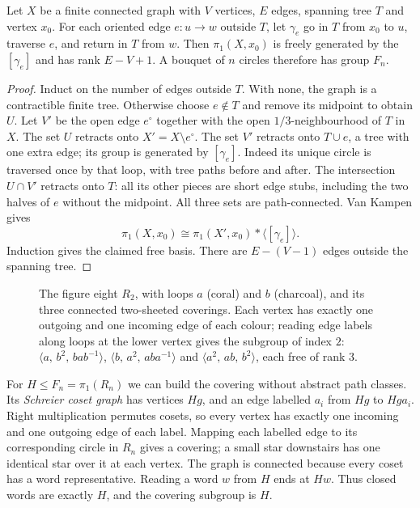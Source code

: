 \begin{theorem}\label{thm:wedge}
Let $X$ be a finite connected graph with $V$ vertices, $E$ edges, spanning tree $T$ and vertex $x_0$. For each oriented edge $e:u\to w$ outside $T$, let $\gamma_e$ go in $T$ from $x_0$ to $u$, traverse $e$, and return in $T$ from $w$. Then $\pi_1(X,x_0)$ is freely generated by the $[\gamma_e]$ and has rank $E-V+1$. A bouquet of $n$ circles therefore has group $F_n$.
\end{theorem}

\begin{proof}
Induct on the number of edges outside $T$. With none, the graph is a contractible finite tree. Otherwise choose $e\notin T$ and remove its midpoint to obtain $U$. Let $V'$ be the open edge $e^\circ$ together with the open $1/3$-neighbourhood of $T$ in $X$. The set $U$ retracts onto $X'=X\setminus e^\circ$. The set $V'$ retracts onto $T\cup e$, a tree with one extra edge; its group is generated by $[\gamma_e]$. Indeed its unique circle is traversed once by that loop, with tree paths before and after. The intersection $U\cap V'$ retracts onto $T$: all its other pieces are short edge stubs, including the two halves of $e$ without the midpoint. All three sets are path-connected. Van Kampen gives
\[
\pi_1(X,x_0)\cong\pi_1(X',x_0)\ast\langle[\gamma_e]\rangle.
\]
Induction gives the claimed free basis. There are $E-(V-1)$ edges outside the spanning tree.
\end{proof}

\begin{figure}[ht]
\centering
{}
\caption{The figure eight $R_2$, with loops $a$ (coral) and $b$ (charcoal), and its three connected two-sheeted coverings. Each vertex has exactly one outgoing and one incoming edge of each
colour; reading edge labels along loops at the lower vertex gives the subgroup of index $2$: $\langle a,\,b^2,\,bab^{-1}\rangle$, $\langle b,\,a^2,\,aba^{-1}\rangle$ and $\langle a^2,\,ab,\,b^2\rangle$, each free of rank $3$.}
\label{fig:coverings}
\end{figure}

For $H\le F_n=\pi_1(R_n)$ we can build the covering without abstract path classes. Its \emph{Schreier coset graph} has vertices $Hg$, and an edge labelled $a_i$ from $Hg$ to $Hga_i$. Right multiplication permutes cosets, so every vertex has exactly one incoming and one outgoing edge of each label. Mapping each labelled edge to its corresponding circle in $R_n$ gives a covering; a small star downstairs has one identical star over it at each vertex. The graph is connected because every coset has a word representative. Reading a word $w$ from $H$ ends at $Hw$. Thus closed words are exactly $H$, and the covering subgroup is $H$.

